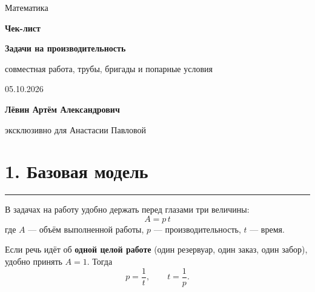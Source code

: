 \documentclass[a4paper,12pt]{article}
\renewcommand{\today}{05.10.2026}
\newcommand{\sectionrule}{\par\vspace{-0.25em}\noindent\textcolor{accent}{\rule{\linewidth}{0.6pt}}\par\vspace{0.25em}}
\newcommand{\key}[1]{\textcolor{darkaccent}{\textbf{#1}}}
\newcommand{\formula}[1]{\[\boxed{#1}\]}
\begin{document}
\thispagestyle{empty}
\begin{center}
\vspace*{24mm}
{\Large\color{softgray}Математика}\par
\vspace{12mm}
{\Huge\bfseries\color{darkaccent}Чек-лист}\par
\vspace{5mm}
{\LARGE\bfseries Задачи на производительность\par}
\vspace{3mm}
{\large совместная работа, трубы, бригады и попарные условия}\par
\vspace{16mm}
{\large\color{softgray}\today}\par
\vfill
{\large\bfseries Лёвин Артём Александрович}\par
\vspace{2mm}
{\normalsize эксклюзивно для Анастасии Павловой}\par
\vspace{24mm}
\end{center}

\clearpage

\section*{1. Базовая модель}
\sectionrule

В задачах на работу удобно держать перед глазами три величины:
\formula{A=p\,t}
где $A$ --- объём выполненной работы, $p$ --- производительность, $t$ --- время.

Если речь идёт об \key{одной целой работе} (один резервуар, один заказ, один забор), удобно принять $A=1$. Тогда
\[
p=\frac{1}{t},\qquad t=\frac{1}{p}.
\]
\end{document}
